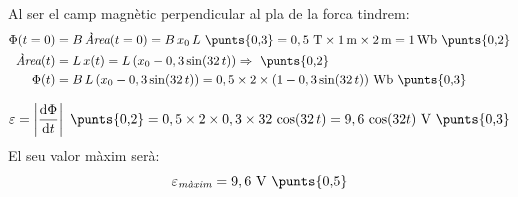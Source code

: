 \begin{solapartat}
Al ser el camp magnètic perpendicular al pla de la forca tindrem:
\begin{align*}
\Phi(t=0) &= B\,\textit{Àrea}(t=0) = B\,x_0\,L \ \text{\punts{0,3}} = 0,5\ \mathrm{T}\times 1\,\mathrm{m}\times 2\,\mathrm{m} = 1\,\mathrm{Wb} \ \text{\punts{0,2}}\\
\textit{Àrea}(t) &= L\,x(t) = L\,(x_0 - 0,3\sin(32\,t)) \Rightarrow \ \text{\punts{0,2}}\\
\Phi(t) &= B\,L\,(x_0 - 0,3\sin(32\,t)) = 0,5\times 2\times(1 - 0,3\sin(32\,t))\ \mathrm{Wb} \ \text{\punts{0,3}}
\end{align*}
\end{solapartat}

\begin{solapartat}
\[ \varepsilon = \left|\frac{\mathrm{d}\Phi}{\mathrm{d}t}\right| \ \text{\punts{0,2}} = 0,5\times 2\times 0,3\times 32\,\cos(32\,t) = 9,6\,\cos(32t)\ \mathrm{V} \ \text{\punts{0,3}} \]
El seu valor màxim serà:
\[ \varepsilon_{\textit{màxim}} = 9,6\ \mathrm{V} \ \text{\punts{0,5}} \]
\end{solapartat}
